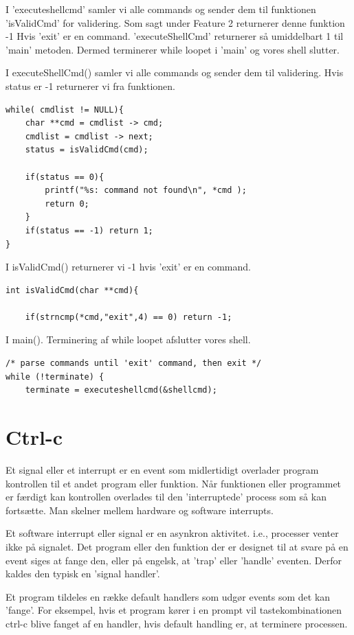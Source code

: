 \documentclass[danish]{report}
\begin{document}

I 'executeshellcmd' samler vi alle commands og sender dem til funktionen 'isValidCmd' for validering. Som sagt under Feature 2 returnerer denne funktion -1 Hvis 'exit' er en command. 'executeShellCmd' returnerer så umiddelbart 1 til 'main' metoden. Dermed terminerer while loopet i 'main' og vores shell slutter. 

I executeShellCmd() samler vi alle commands og sender dem til validering. Hvis status er -1 returnerer vi fra funktionen.


\begin{lstlisting}
while( cmdlist != NULL){
	char **cmd = cmdlist -> cmd;
	cmdlist = cmdlist -> next;
	status = isValidCmd(cmd);

	if(status == 0){ 
		printf("%s: command not found\n", *cmd );
		return 0;
	}
	if(status == -1) return 1;
}
\end{lstlisting}

I isValidCmd() returnerer vi -1 hvis 'exit' er en command.
\begin{lstlisting}
int isValidCmd(char **cmd){
	
	if(strncmp(*cmd,"exit",4) == 0) return -1;
\end{lstlisting}

I main(). Terminering af while loopet afslutter vores shell. 
\begin{lstlisting}
/* parse commands until 'exit' command, then exit */
while (!terminate) {
	terminate = executeshellcmd(&shellcmd);
\end{lstlisting}

\section{Ctrl-c}

Et signal eller et interrupt er en event som midlertidigt overlader program kontrollen til et andet program eller funktion. Når funktionen eller programmet er færdigt kan kontrollen overlades til den 'interruptede' process som så kan fortsætte. Man skelner mellem hardware og software interrupts.

Et software interrupt eller signal er en asynkron aktivitet. i.e., processer venter ikke på signalet. Det program eller den funktion der er designet til at svare på en event siges at fange den, eller på engelsk,  at 'trap' eller 'handle' eventen. Derfor kaldes den typisk en 'signal handler'. 

Et program tildeles en række default handlers som udgør events som det kan 'fange'. For eksempel, hvis et program kører i en prompt vil tastekombinationen ctrl-c blive fanget af en handler, hvis default handling er, at terminere processen. 
\end{document}

